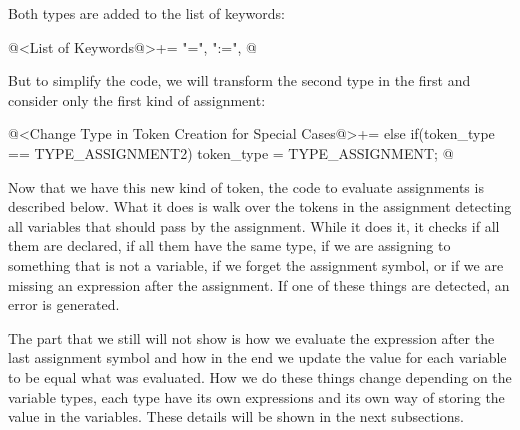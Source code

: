 Both types are added to the list of keywords:

\iniciocodigo
@<List of Keywords@>+=
"=", ":=",
@
\fimcodigo

But to simplify the code, we will transform the second type in the
first and consider only the first kind of assignment:

\iniciocodigo
@<Change Type in Token Creation for Special Cases@>+=
else if(token_type == TYPE_ASSIGNMENT2)
  token_type = TYPE_ASSIGNMENT;
@
\fimcodigo


Now that we have this new kind of token, the code to evaluate
assignments is described below. What it does is walk over the tokens
in the assignment detecting all variables that should pass by the
assignment. While it does it, it checks if all them are declared, if
all them have the same type, if we are assigning to something that is
not a variable, if we forget the assignment symbol, or if we are
missing an expression after the assignment. If one of these things are
detected, an error is generated.

The part that we still will not show is how we evaluate the expression
after the last assignment symbol and how in the end we update the
value for each variable to be equal what was evaluated. How we do
these things change depending on the variable types, each type have
its own expressions and its own way of storing the value in the
variables. These details will be shown in the next subsections.

